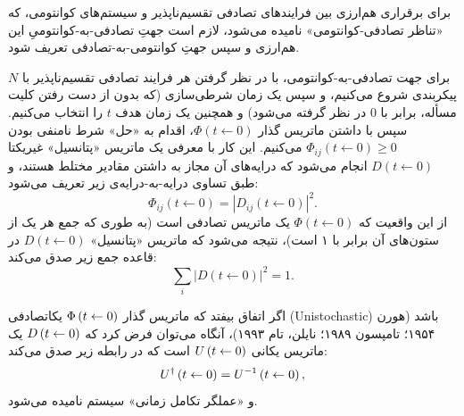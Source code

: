 \documentclass{article}
\newcommand{\stochasticmatrix}{\Phi}
\newcommand{\dynop}{D}
\newcommand{\timeevop}{U}
\begin{document}
برای برقراری هم‌ارزی بین فرایندهای تصادفی تقسیم‌ناپذیر و سیستم‌های کوانتومی، که «تناظر تصادفی-کوانتومی» نامیده می‌شود، لازم است جهتِ تصادفی-به-کوانتومیِ این هم‌ارزی و سپس جهتِ کوانتومی-به-تصادفی تعریف شود.

برای جهت تصادفی-به-کوانتومی، با در نظر گرفتن هر فرایند تصادفی تقسیم‌ناپذیر با $N$ پیکربندی شروع می‌کنیم، و سپس یک زمان شرطی‌سازی (که بدون از دست رفتن کلیت مسأله، برابر با $0$ در نظر گرفته می‌شود) و همچنین یک زمان هدف $t$ را انتخاب می‌کنیم. سپس با داشتن ماتریس گذار $\stochasticmatrix\left(t \leftarrow 0\right)$، اقدام به «حل» شرط نامنفی بودن $\stochasticmatrix_{ij}\left(t \leftarrow 0\right)\geq0$ می‌کنیم. این کار با معرفی یک ماتریس «پتانسیل» غیریکتا $\dynop\left(t \leftarrow 0\right)$ انجام می‌شود که درایه‌های آن مجاز به داشتن مقادیر مختلط هستند، و طبق تساوی درایه-به-درایه‌ی زیر تعریف می‌شود:
\begin{equation}
\stochasticmatrix_{ij}\left(t \leftarrow 0\right)=\left|\dynop_{ij}\left(t \leftarrow 0\right)\right|^{2}.\label{eq:TransitionMatrixFroModSquarePotentialMatrix}
\end{equation}
از این واقعیت که $\stochasticmatrix\left(t \leftarrow 0\right)$ یک ماتریس تصادفی است (به طوری که جمع هر یک از ستون‌های آن برابر با ۱ است)، نتیجه می‌شود که ماتریس «پتانسیل» $\dynop\left(t \leftarrow 0\right)$ در قاعده جمع زیر صدق می‌کند:
\begin{equation}
\sum_{i}\left|\dynop\left(t \leftarrow 0\right)\right|^{2}=1.\label{eq:PotentialMatrixSumRule}
\end{equation}

اگر اتفاق بیفتد که ماتریس گذار $\stochasticmatrix\left(t\from0\right)$ یکاتصادفی (Unistochastic) باشد (هورن ۱۹۵۴؛ تامپسون ۱۹۸۹؛ نایلن، تام ۱۹۹۳)\nocite{Horn:1954dsmatdoarm,Thompson:1989uln,NylenTamUhlig:1993oteopsonhasm}،
آنگاه می‌توان فرض کرد که $\dynop\left(t\from0\right)$ یک ماتریس یکانی $\timeevop\left(t\from0\right)$ است که در رابطه زیر صدق می‌کند:
\begin{equation}
\timeevop^{\adj}\left(t\from0\right)=\timeevop^{-1}\left(t\from0\right),\label{eq:TimeEvOpUnitary}
\end{equation}
و «عملگر تکامل زمانی» سیستم نامیده می‌شود.
\end{document}
